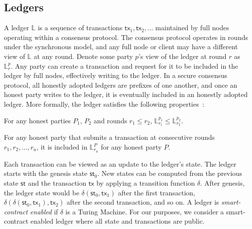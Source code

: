 
\subsection{Ledgers}
A ledger $\mathbb{L}$ is a sequence of transactions $\textsf{tx}_1, \textsf{tx}_2, \dots$ maintained by full nodes operating within a consensus protocol.
The consensus protocol operates in rounds under the synchronous model, and any full node or client may have a different view of $\mathbb{L}$ at any round. 
Denote some party $p$'s view of the ledger at round $r$ as $\mathbb{L}_r^p$.
Any party can create a transaction and request for it to be included in the ledger by full nodes, effectively writing to the ledger.
In a secure consensus protocol, all honestly adopted ledgers are prefixes of one another, and once an honest party writes to the ledger, it is eventually included in an honestly adopted ledger.
More formally, the ledger satisfies the following properties~\cite{popos}:

\begin{definition}[Safety]
    For any honest parties $P_1$, $P_2$ and rounds $r_1 \leq r_2$, $\mathbb{L}_{r_1}^{p_1} \leq \mathbb{L}_{r_2}^{p_2}$.
\end{definition}
\begin{definition}[Liveness]
    For any honest party that submits a transaction at consecutive rounds $r_1, r_2, \dots, r_u$, it is included in $\mathbb{L}_{r_u}^P$ for any honest party $P$.
\end{definition}

Each transaction can be viewed as an update to the ledger's state.
The ledger starts with the genesis state $\textsf{st}_0$.
New states can be computed from the previous state $\textsf{st}$ and the transaction $\textsf{tx}$ by applying a transition function $\delta$.
After genesis, the ledger state would be $\delta(\textsf{st}_0, \textsf{tx}_1)$ after the first transaction, $\delta(\delta(\textsf{st}_0, \textsf{tx}_1), \textsf{tx}_2)$ after the second transaction, and so on.
A ledger is \emph{smart-contract enabled} if $\delta$ is a Turing Machine. %
For our purposes, we consider a smart-contract enabled ledger where all state and transactions are public.

